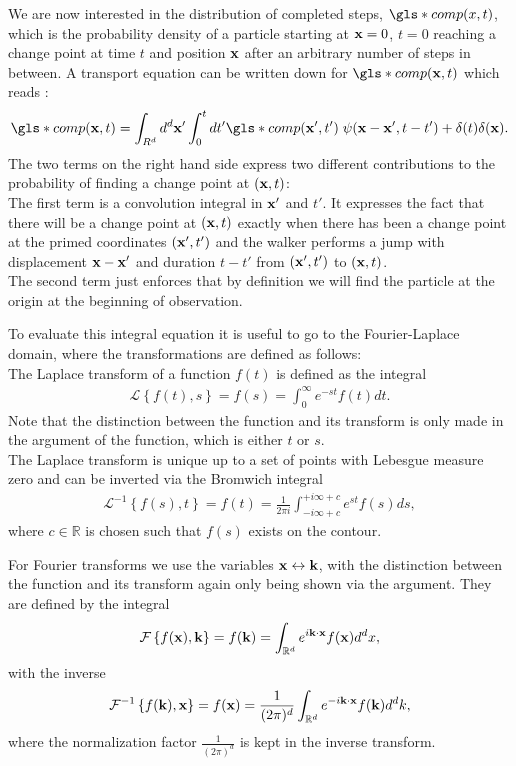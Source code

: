 We are now interested in the distribution of completed steps, $\gls*{comp}(x,t)$, which is the probability density of a particle starting at $\mathbf{ x }=0$, $t=0$ reaching a change point at time $t$ and position $\mathbf{ x }$ after an arbitrary number of steps in between. A transport equation can be written down for $\gls*{comp}(\ve{x},t)$ which reads
\cite{firstSteps}:
%
\begin{align}
\gls*{comp}(\ve{x},t) = \int_{R^{d}} d^{d}\ve{x}' \int_{0}^{t} dt' \gls*{comp}(\ve{x}',t')  \; \psi(\ve{x}-\ve{x}',t-t') + \delta(t) \delta(\ve{x}) . \label{eqn:CTransport}
\end{align}
%
The two terms on the right hand side express two different contributions to the probability of finding a change point at $(\mathbf{ x },t)$: \\
The first term is a convolution integral in $\mathbf{ x' }$ and $t'$. It expresses the fact that there will be a change point at $(\mathbf{ x },t)$ exactly when there has been a change point at the primed coordinates $(\mathbf{ x' },t')$ and the walker performs a jump with displacement $\mathbf{ x }-\mathbf{ x }'$ and duration $t-t'$ from $(\mathbf{ x' },t')$ to $(\mathbf{ x },t)$.  \\
The second term just enforces that by definition we will find the particle at the origin at the beginning of observation. 

To evaluate this integral equation it is useful to go to the Fourier-Laplace domain, where the transformations are defined as follows:\\
The Laplace transform of a function $f(t)$ is defined as the integral 
%
\begin{align}
\mathcal{L} \left\{ f(t), s \right\} = f(s) = \int^{\infty}_{0} e^{-st} f(t) dt .
\end{align}
%
Note that the distinction between the function and its transform is only made in the argument of the function, which is either $t$ or $s$. \\
The Laplace transform is unique up to a set of points with Lebesgue measure zero and can be inverted via the Bromwich integral 
%
\begin{align}
\mathcal{L}^{-1} \left\{ f(s), t \right\} = f(t) = \frac{1}{2 \pi i} \int^{+i \infty + c}_{-i \infty + c} e^{st} f(s) ds, 
\end{align}
%
where $c \in \mathbb{R}$ is chosen such that $f(s)$ exists on the contour. 

For Fourier transforms we use the variables $\mathbf{ x } \leftrightarrow \mathbf{ k }$, with the distinction between the function and its transform again only being shown via the argument. They are defined by the integral 
%
\begin{align}
\mathcal{F} \left\{ f(\mathbf{ x }), \mathbf{ k } \right\} = f(\mathbf{ k }) = \int_{\mathbb{R}^{d}} e^{i\mathbf{ k } \cdot \mathbf{ x }} f(\mathbf{ x }) d^{d}x ,
\end{align}
%
with the inverse 
%
\begin{align}
\mathcal{F}^{-1} \left\{ f(\mathbf{ k }), \mathbf{ x } \right\} = f(\mathbf{ x }) = \frac{1}{(2 \pi)^{d}} \int_{\mathbb{R}^{d}} e^{-i\mathbf{ k } \cdot \mathbf{ x }} f(\mathbf{ k }) d^{d}k ,
\end{align}
%
where the normalization factor $\frac{1}{(2 \pi)^{d}}$ is kept in the inverse transform.

